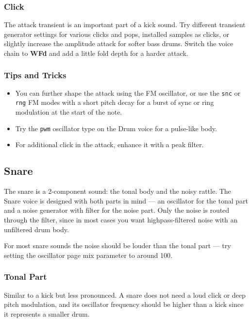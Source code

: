 \subsubsection{Click}\label{click}

The attack transient is an important part of a kick sound. Try different
transient generator settings for various clicks and pops, installed
samples as clicks, or slightly increase the amplitude attack for softer
bass drums. Switch the voice chain to \textbf{WFd} and add a little fold
depth for a harder attack.

\subsubsection{Tips and Tricks}\label{tips-and-tricks}

\begin{itemize}
\tightlist
\item
  You can further shape the attack using the FM oscillator, or use the
  \texttt{snc} or \texttt{rng} FM modes with a short pitch decay for a
  burst of sync or ring modulation at the start of the note.
\item
  Try the \texttt{pwm} oscillator type on the Drum voice for a
  pulse-like body.
\item
  For additional click in the attack, enhance it with a peak filter.
\end{itemize}

\subsection{Snare}\label{snare}

The snare is a 2-component sound: the tonal body and the noisy rattle.
The Snare voice is designed with both parts in mind --- an oscillator
for the tonal part and a noise generator with filter for the noise part.
Only the noise is routed through the filter, since in most cases you
want highpass-filtered noise with an unfiltered drum body.

For most snare sounds the noise should be louder than the tonal part ---
try setting the oscillator page mix parameter to around 100.

\subsubsection{Tonal Part}\label{tonal-part}

Similar to a kick but less pronounced. A snare does not need a loud
click or deep pitch modulation, and its oscillator frequency should be
higher than a kick since it represents a smaller drum.

